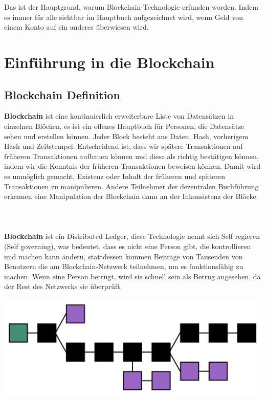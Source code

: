 \documentclass[ngerman]{scrreprt}
\begin{document}
Das ist der Hauptgrund, warum Blockchain-Technologie erfunden worden. Indem es immer für alle sichtbar im Hauptbuch aufgezeichnet wird, wenn Geld von einem Konto auf ein anderes überwiesen wird.



\chapter{Einführung in die Blockchain}

\section{Blockchain Definition}
\textbf{Blockchain} ist eine kontinuierlich erweiterbare Liste von Datensätzen in einzelnen Blöcken, es ist ein offenes Hauptbuch für Personen, die Datensätze sehen und erstellen können. Jeder Block besteht aus Daten, Hash, vorherigem Hash und Zeitstempel. Entscheidend ist, dass wir spätere Transaktionen auf früheren Transaktionen aufbauen können und diese als richtig bestätigen können, indem wir die Kenntnis der früheren Transaktionen beweisen können. Damit wird es unmöglich gemacht, Existenz oder Inhalt der früheren und späteren Transaktionen zu manipulieren. Andere Teilnehmer der dezentralen Buchführung erkennen eine Manipulation der Blockchain dann an der Inkonsistenz der Blöcke.\\
\\
\\
\\
\textbf{Blockchain} ist ein Distributed Ledger, diese Technologie nennt sich Self regieren (Self governing), was bedeutet, dass es nicht eine Person gibt, die kontrollieren und machen kann
ändern, stattdessen kommen Beiträge von Tausenden von Benutzern
die am Blockchain-Netzwerk teilnehmen, um es funktionsfähig zu machen. Wenn eine Person betrügt, wird sie schnell sein
als Betrug angesehen, da der Rest des Netzwerks sie überprüft.


\includegraphics[width=\linewidth]{1.png}
\end{document}
